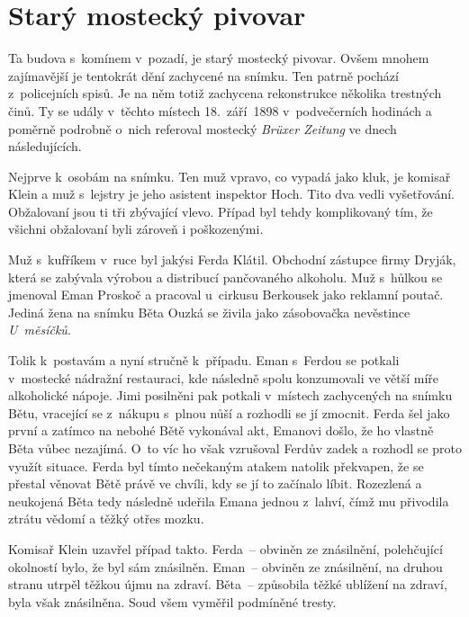 
\chapter{Starý mostecký pivovar}

Ta budova s~komínem v~pozadí, je starý mostecký pivovar. Ovšem mnohem
zajímavější je tentokrát dění zachycené na snímku. Ten patrně pochází
z~policejních spisů. Je na něm totiž zachycena rekonstrukce několika
trestných činů. Ty se udály v~těchto místech 18.~září~1898
v~podvečerních hodinách a poměrně podrobně o~nich referoval mostecký
{\em Brüxer Zeitung} ve dnech následujících.

Nejprve k~osobám na snímku. Ten muž vpravo, co vypadá jako kluk, je komisař
Klein a muž s~lejstry je jeho asistent inspektor Hoch. Tito dva vedli
vyšetřování. Obžalovaní jsou ti tři zbývající vlevo. Případ byl tehdy
komplikovaný tím, že všichni obžalovaní byli zároveň i poškozenými.

Muž s~kufříkem v~ruce byl jakýsi Ferda Klátil. Obchodní zástupce firmy Dryják,
která se zabývala výrobou a distribucí pančovaného alkoholu. Muž s~hůlkou se
jmenoval Eman Proskoč a pracoval u~cirkusu Berkousek jako reklamní poutač.
Jediná žena na snímku Běta Ouzká se živila jako zásobovačka nevěstince {\em
U~měsíčků}.

Tolik k~postavám a nyní stručně k~případu. Eman s~Ferdou se potkali v~mostecké
nádražní restauraci, kde následně spolu konzumovali ve větší míře alkoholické
nápoje. Jimi posilněni pak potkali v~místech zachycených na snímku Bětu,
vracející se z~nákupu s~plnou nůší a rozhodli se jí zmocnit. Ferda šel jako
první a zatímco na nebohé Bětě vykonával akt, Emanovi došlo, že ho vlastně Běta
vůbec nezajímá. O~to víc ho však vzrušoval Ferdův zadek a rozhodl se proto
využít situace. Ferda byl tímto nečekaným atakem natolik překvapen, že se
přestal věnovat Bětě právě ve chvíli, kdy se jí to začínalo líbit. Rozezlená a
neukojená Běta tedy následně udeřila Emana jednou z~lahví, čímž mu přivodila
ztrátu vědomí a těžký otřes mozku.

Komisař Klein uzavřel případ takto. Ferda~-- obviněn ze znásilnění, polehčující
okolností bylo, že byl sám znásilněn. Eman~-- obviněn ze znásilnění, na druhou
stranu utrpěl těžkou újmu na zdraví. Běta~-- způsobila těžké ublížení na
zdraví, byla však znásilněna. Soud všem vyměřil podmíněné tresty.
